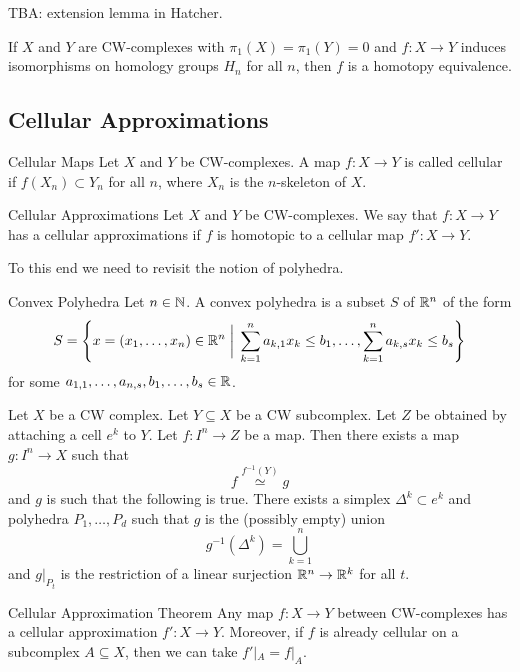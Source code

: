 \documentclass[a4paper]{article}
\begin{document}
TBA: extension lemma in Hatcher. 

\begin{crl}{}{} If $X$ and $Y$ are CW-complexes with $\pi_1(X)=\pi_1(Y)=0$ and $f:X\to Y$ induces isomorphisms on homology groups $H_n$ for all $n$, then $f$ is a homotopy equivalence. 
\end{crl}

\subsection{Cellular Approximations}
\begin{defn}{Cellular Maps}{} Let $X$ and $Y$ be CW-complexes. A map $f:X\to Y$ is called cellular if $f(X_n)\subset Y_n$ for all $n$, where $X_n$ is the $n$-skeleton of $X$. 
\end{defn}

\begin{defn}{Cellular Approximations}{} Let $X$ and $Y$ be CW-complexes. We say that $f:X\to Y$ has a cellular approximations if $f$ is homotopic to a cellular map $f':X\to Y$. 
\end{defn}

To this end we need to revisit the notion of polyhedra. 

\begin{defn}{Convex Polyhedra}{} Let $n\in\mathbb{N}$. A convex polyhedra is a subset $S$ of $\mathbb{R}^n$ of the form $$S=\left\{x=(x_1,\dots,x_n)\in\mathbb{R}^n\;\bigg{|}\;\sum_{k=1}^na_{k,1}x_k\leq b_1,\dots,\sum_{k=1}^n a_{k,s}x_k\leq b_s\right\}$$ for some $a_{1,1},\dots,a_{n,s},b_1,\dots,b_s\in\mathbb{R}$. 
\end{defn}

\begin{lmm}{}{} Let $X$ be a CW complex. Let $Y\subseteq X$ be a CW subcomplex. Let $Z$ be obtained by attaching a cell $e^k$ to $Y$. Let $f:I^n\to Z$ be a map. Then there exists a map $g:I^n\to X$ such that $$f\overset{f^{-1}(Y)}{\simeq} g$$ and $g$ is such that the following is true. There exists a simplex $\Delta^k\subset e^k$ and polyhedra $P_1,\dots,P_d$ such that $g$ is the (possibly empty) union $$g^{-1}(\Delta^k)=\bigcup_{k=1}^n$$ and $g|_{P_t}$ is the restriction of a linear surjection $\mathbb{R}^n\to\mathbb{R}^k$ for all $t$. 
\end{lmm}

\begin{thm}{Cellular Approximation Theorem}{} Any map $f:X\to Y$ between CW-complexes has a cellular approximation $f':X\to Y$. Moreover, if $f$ is already cellular on a subcomplex $A\subseteq X$, then we can take $f'|_A=f|_A$. 
\end{thm}
\end{document}
